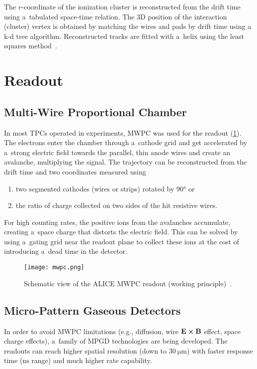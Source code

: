 				The $r$\nobreakdash-coordinate of the ionization cluster is reconstructed from the drift time using a~tabulated space-time relation. The 3D position of the interaction (cluster) vertex is obtained by matching the wires and pads by drift time using a k\nobreakdash-d tree algorithm. Reconstructed tracks are fitted with a~helix using the least squares method~\cite{alpha_reco}.
	
	\section{Readout}
	\label{sec:readout}
		\subsection{Multi-Wire Proportional Chamber}
		\label{sec:MWPC}
			In most \acp{TPC} operated in experiments, \acf{MWPC} was used for the readout (\cref{fig:mwpc}). The electrons enter the chamber through a~cathode grid and get accelerated by a~strong electric field towards the parallel, thin anode wires and create an avalanche, multiplying the signal. The trajectory can be reconstructed from the drift time and two coordinates measured using
			\begin{enumerate}[nosep,label=\alph*)]
				\item two segmented cathodes (wires or strips) rotated by $\ang{90}$ or
				\item the ratio of charge collected on two sides of the hit resistive wires.
			\end{enumerate}
			For high counting rates, the positive ions from the avalanches accumulate, creating a~space charge that distorts the electric field. This can be solved by using a~gating grid near the readout plane to collect these ions at the cost of introducing a~dead time in the detector.
			
			\begin{figure}
				\centering
				\texttt{[image: mwpc.png]}
				\caption{Schematic view of the ALICE \ac{MWPC} readout (working principle)~\cite{mwpc}.}
				\label{fig:mwpc}
			\end{figure}
			
		\subsection{Micro-Pattern Gaseous Detectors}
		\label{sec:mpgd}
			In order to avoid \ac{MWPC} limitations (e.g., diffusion, wire $\mathbf{E}\cross\mathbf{B}$ effect, space charge effects), a~family of \acf{MPGD} technologies are being developed. The readouts can reach higher spatial resolution (down to $\qty{30}{\um}$) with faster response time ($\unit{\ns}$ range) and much higher rate capability.
			
